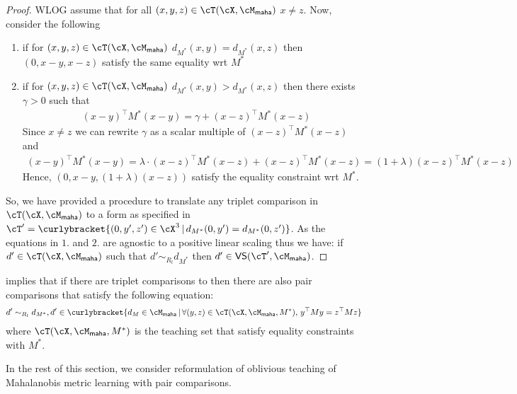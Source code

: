\begin{proof}
    WLOG assume that for all $(x,y,z) \in \cT(\cX, \cM_{\textsf{maha}})$ $x \neq z$. Now, consider the following 
   \begin{enumerate}
       \item if for $(x,y,z) \in \cT(\cX, \cM_{\textsf{maha}})$ $d_{M^*}(x,y) = d_{M^*}(x,z)$ then $(0, x-y, x-z)$ satisfy the same equality wrt $M^*$
       \item if for $(x,y,z) \in \cT(\cX, \cM_{\textsf{maha}})$ $d_{M^*}(x,y) > d_{M^*}(x,z)$ then there exists $\gamma > 0$ such that
       \begin{align*}
           &(x-y)^{\top}M^*(x-y) = \gamma + (x-z)^{\top}M^*(x-z)
       \end{align*}
       Since $x \neq z$ we can rewrite $\gamma$ as a scalar multiple of $(x-z)^{\top}M^*(x-z)$ and 
       \begin{align*}
           (x-y)^{\top}M^*(x-y) = \lambda\cdot (x-z)^{\top}M^*(x-z) + (x-z)^{\top}M^*(x-z) = (1 + \lambda) (x-z)^{\top}M^*(x-z)
       \end{align*}
       Hence, $(0, x - y, (1 + \lambda)(x-z))$ satisfy the equality constraint wrt $M^*$.
   \end{enumerate}
   So, we have provided a procedure to translate any triplet comparison in $\cT(\cX, \cM_{\textsf{maha}})$ to a form as specified in $\cT' = \curlybracket{(0,y',z') \in\cX^3\,|\, d_{M^*}(0, y') = d_{M^*}(0, z')}$. As the equations in $1.$ and $2.$ are agnostic to a positive linear scaling thus we have: if $d' \in \cT(\cX, \cM_{\textsf{maha}})$ such that $d' \sim_{R_l} d_{M^*}$ then $d' \in \textsf{VS}(\cT', \cM_{\textsf{maha}})$.
\end{proof}

 implies that if there are triplet comparisons to  then there are also pair comparisons that satisfy the following equation:
\begin{align}
    d' \sim_{R_l} d_{M^*}, d'  \in \curlybracket{d_M \in \cM_{\textsf{maha}}\,|\, \forall (y,z) \in \cT(\cX,\cM_{\textsf{maha}},M^*),\, y^{\top}My = z^{\top}Mz} \label{eq: redsol}
\end{align}
where $\cT(\cX,\cM_{\textsf{maha}},M^*)$ is  the teaching set that satisfy equality constraints with $M^*$.

In the rest of this section, we consider reformulation of oblivious teaching of Mahalanobis metric learning with pair comparisons.

